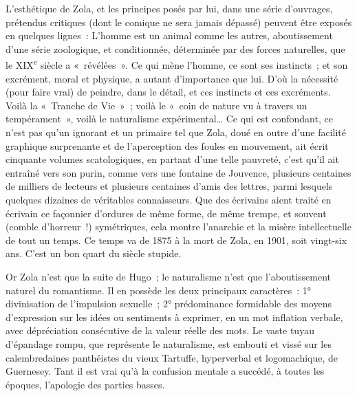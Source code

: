 \documentclass[french,twoside]{book} %
\begin{document}
L’esthétique de Zola, et les principes posés par lui, dans une série d’ouvrages, prétendus critiques (dont le comique ne sera jamais dépassé) peuvent être exposés en quelques lignes : L’homme est un animal comme les autres, aboutissement d’une série zoologique, et conditionnée, déterminée par des forces naturelles, que le XIX\textsuperscript{e} siècle a « révélées ». Ce qui mène l’homme, ce sont ses instincts ; et son excrément, moral et physique, a autant d’importance que lui. D’où la nécessité (pour faire vrai) de peindre, dans le détail, et ces instincts et ces excréments. Voilà la « Tranche de Vie » ; voilà le « coin de nature vu à travers un tempérament », voilà le naturalisme expérimental… Ce qui est confondant, ce n’est pas qu’un ignorant et un primaire tel que Zola, doué en outre d’une facilité graphique surprenante et de l’aperception des foules en mouvement, ait écrit cinquante volumes scatologiques, en partant d’une telle pauvreté, c’est qu’il ait entraîné vers son purin, comme vers une fontaine de Jouvence, plusieurs centaines de milliers de lecteurs et plusieurs centaines d’amis des lettres, parmi lesquels quelques dizaines de véritables connaisseurs. Que des écrivains aient traité en écrivain ce façonnier d’ordures de même forme, de même trempe, et souvent (comble d’horreur !) symétriques, cela montre l’anarchie et la misère intellectuelle de tout un temps. Ce temps va de 1875 à la mort de Zola, en 1901, soit vingt-six ans. C’est un bon quart du siècle stupide.\par
Or Zola n’est que la suite de Hugo ; le naturalisme n’est que l’aboutissement naturel du romantisme. Il en possède les deux principaux caractères : 1° divinisation de l’impulsion sexuelle ; 2° prédominance formidable des moyens d’expression sur les idées ou sentiments à exprimer, en un mot inflation verbale, avec dépréciation consécutive de la valeur réelle des mots. Le vaste tuyau d’épandage rompu, que représente le naturalisme, est embouti et vissé sur les calembredaines panthéistes du vieux Tartuffe, hyperverbal et logomachique, de Guernesey. Tant il est vrai qu’à la confusion mentale a succédé, à toutes les époques, l’apologie des parties basses.\par
\end{document}
